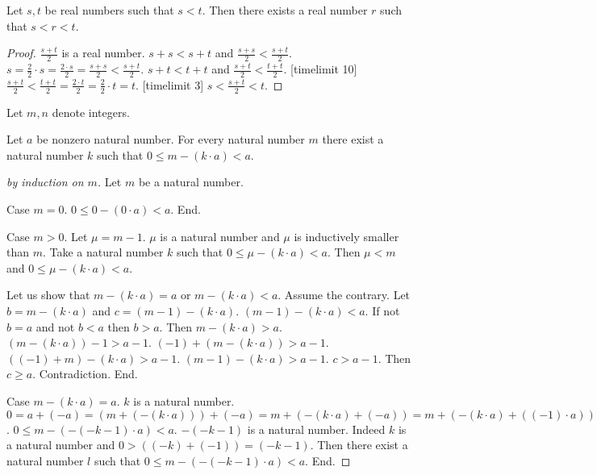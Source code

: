 \documentclass{article}
\begin{document}
\begin{forthel}

\begin{lemma}
Let $s,t$ be real numbers such that $s < t$.
Then there exists a real number $r$ such that $s < r < t$.
\end{lemma}
\begin{proof}
$\frac{s+t}{2}$ is a real number. $s + s < s + t$ and $\frac{s + s}{2} < \frac{s + t}{2}$.
$s = \frac{2}{2} \cdot s = \frac{2 \cdot s}{2} = \frac{s + s}{2} < \frac{s + t}{2}$.
$s + t < t + t$ and $\frac{s + t}{2} < \frac{t + t}{2}$.
[timelimit 10]
$\frac{s+t}{2} < \frac{t+t}{2} = \frac{2 \cdot t}{2} = \frac{2}{2} \cdot t = t$.
[timelimit 3]
$s < \frac{s+t}{2} < t$.
\end{proof}



Let $m,n$ denote integers.


\begin{proposition}
Let $a$ be nonzero natural number.
For every natural number $m$ there exist
a natural number $k$ such that $0 \leq m - (k \cdot a) < a$.
\end{proposition}
\begin{proof}[by induction on $m$]
Let $m$ be a natural number.

Case $m = 0$.
$0 \leq 0 - (0 \cdot a) < a$. End.

Case $m > 0$. Let $\mu = m-1$.
$\mu$ is a natural number and $\mu$ is inductively smaller than $m$.
Take a natural number $k$ such that $0 \leq \mu - (k \cdot a) < a$.
Then $\mu < m$ and $0 \leq \mu - (k \cdot a) <  a$.

Let us show that $m - (k \cdot a) = a$ or $m - (k \cdot a) < a$.
Assume the contrary.
Let $b = m - (k \cdot a)$ and $c = (m-1) - (k \cdot a)$.
$(m-1) - (k \cdot a) < a$.
If not $b = a$ and not $b < a$ then $b > a$.
Then $m - (k \cdot a) > a$.
$(m - (k \cdot a)) - 1 > a - 1$.
$(-1) + (m - (k\cdot a)) > a - 1$.
$((-1) + m) - (k \cdot a) > a - 1$.
$(m-1) - (k \cdot a) > a - 1$.
$c > a-1$.
Then $c \geq a$.
Contradiction.
End.

Case $m - (k \cdot a) = a$.
$k$ is a natural number.
$0 =
a + (-a) =
(m + (-(k \cdot a))) + (-a) =
m + (-(k \cdot a) + (-a)) =
m + (-(k \cdot a) + ((-1) \cdot a)) =
m + (((-k) \cdot a) + ((-1) \cdot a)) =
m + (((-k)+(-1)) \cdot a) =
m + ((-k-1) \cdot a) =
m - (-(-k-1) \cdot a)$.
$0 \leq m - (-(-k-1) \cdot a) < a$.
$-(-k-1)$ is a natural number.
Indeed $k$ is a natural number and $0 > ((-k) + (-1)) = (-k-1)$.
Then there exist a natural number $l$ such that
$0 \leq m - (-(-k-1) \cdot a) < a$.
End.


\end{proof}
\end{forthel}
\end{document}

